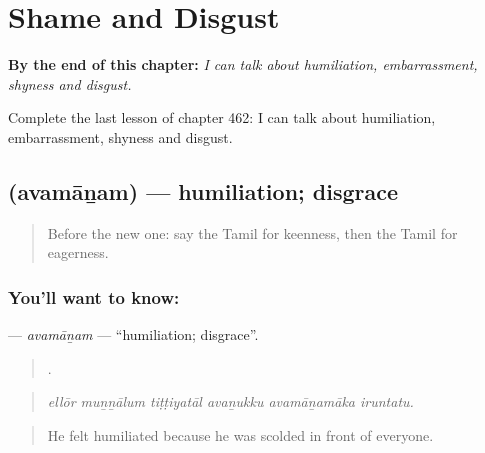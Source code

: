 
\chapter{Shame and Disgust}
\label{ch:ta-shame-and-disgust}

\begin{chapteropening}
\textbf{By the end of this chapter:} \emph{I can talk about humiliation, embarrassment, shyness and disgust.}

Complete the last lesson of chapter 462: I can talk about humiliation, embarrassment, shyness and disgust.
\end{chapteropening}

\section[\texorpdfstring{\ta{அவமானம்} (avamāṉam)}{அவமானம் (avamāṉam)}]{ (avamāṉam) — humiliation; disgrace}

\label{lesson:TA-C462-avamanam}



\begin{quote}
Before the new one: say the Tamil for keenness, then the Tamil for eagerness.
\end{quote}

\subsection*{You'll want to know: }
\textbf{} — \emph{avamāṉam} — \textquotedblleft{}humiliation; disgrace\textquotedblright{}.

\begin{quote}
     .
\end{quote}

\begin{quote}
\emph{ellōr muṉṉālum tiṭṭiyatāl avaṉukku avamāṉamāka iruntatu.}
\end{quote}

\begin{quote}
He felt humiliated because he was scolded in front of everyone.
\end{quote}


